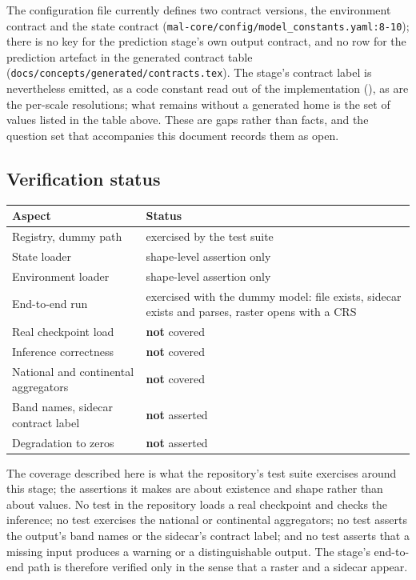 \documentclass[11pt,a4paper]{article}
\newcommand{\code}[1]{\texttt{#1}}
\begin{document}
The configuration file currently defines two contract versions, the
environment contract and the state contract
(\code{mal-core/config/model\_constants.yaml:8-10}); there is no key for the
prediction stage's own output contract, and no row for the prediction
artefact in the generated contract table
(\code{docs/concepts/generated/contracts.tex}). The stage's contract label
is nevertheless emitted, as a code constant read out of the implementation
(), as are the per-scale
resolutions; what remains without a generated home is the set of values
listed in the table above. These are gaps rather than facts, and the
question set that accompanies this document records them as open.

\subsection{Verification status}

\begin{center}
\begin{tabular}{@{}lp{9.5cm}@{}}
\toprule
Aspect & Status \\
\midrule
Registry, dummy path & exercised by the test suite \\
State loader & shape-level assertion only \\
Environment loader & shape-level assertion only \\
End-to-end run & exercised with the dummy model: file exists, sidecar
  exists and parses, raster opens with a CRS \\
Real checkpoint load & \textbf{not} covered \\
Inference correctness & \textbf{not} covered \\
National and continental aggregators & \textbf{not} covered \\
Band names, sidecar contract label & \textbf{not} asserted \\
Degradation to zeros & \textbf{not} asserted \\
\bottomrule
\end{tabular}
\end{center}

The coverage described here is what the repository's test suite exercises
around this stage; the assertions it makes are about existence and shape
rather than about values. No test in the repository loads a real checkpoint
and checks the inference; no test exercises the national or continental
aggregators; no test asserts the output's band names or the sidecar's
contract label; and no test asserts that a missing input produces a warning
or a distinguishable output. The stage's end-to-end path is therefore
verified only in the sense that a raster and a sidecar appear.
\end{document}
